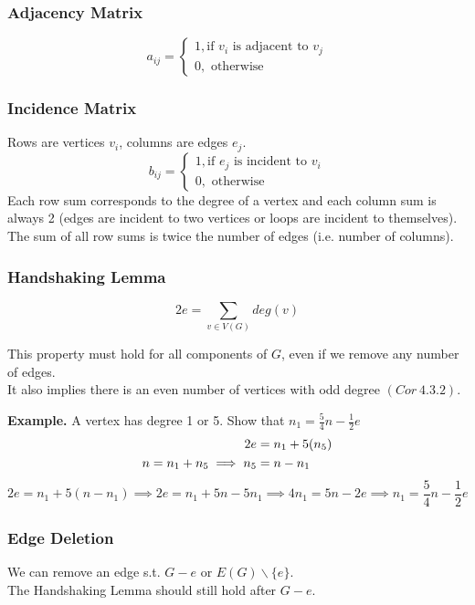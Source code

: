 \documentclass[11pt]{article}
\newenvironment{eg}[1]{
\begin{tcolorbox}[colback = white!15, arc=0pt,outer arc=0pt, colframe = black]
{\color{black} \textbf{Example.} #1} \\[5pt]
}
{
\end{tcolorbox}
}
\newcommand{\nl}{\\[5pt]}
\begin{document}
\subsubsection{Adjacency Matrix}
\[a_{ij}=  \begin{cases} 
        1, \text{if } v_i \text{ is adjacent to } v_j\\
        0, \text{ otherwise}
    \end{cases}
    \]

\subsubsection{Incidence Matrix}
Rows are vertices $v_i$, columns are edges $e_j$.
    \[b_{ij}=  \begin{cases} 
        1, \text{if } e_j \text{ is incident to } v_i\\
        0, \text{ otherwise}
    \end{cases}
    \]
Each row sum corresponds to the degree of a vertex and each column sum is always 2 (edges are incident to two vertices or loops are incident to themselves). The sum of all row sums is twice the number of edges (i.e. number of columns). 

\subsubsection{Handshaking Lemma}
$$2e = \sum_{v \in V(G)}deg(v)$$

This property must hold for all components of $G$, even if we remove any number of edges. \nl It also implies there is an even number of vertices with odd degree $(Cor\: 4.3.2)$. 

\begin{eg}{A vertex has degree 1 or 5. Show that $n_1 = \frac{5}{4}n - \frac{1}{2}e$}
\vspace{-20pt}
\begin{align}
    \setcounter{equation}{0}
    2e &= n_1 + 5(n_5)\\
    n = n_1 + n_5 \implies n_5 &= n - n_1
\end{align}
$$2e = n_1 + 5(n - n_1) \implies 2e = n_1 + 5n - 5n_1 \implies 4n_1 = 5n - 2e \implies n_1 = \frac{5}{4}n - \frac{1}{2}e $$
\end{eg}

\subsubsection{Edge Deletion}
We can remove an edge s.t. $G - e$ or $E(G) \backslash \{e\}$. \nl 
The Handshaking Lemma should still hold after $G - e$. 
\end{document}
